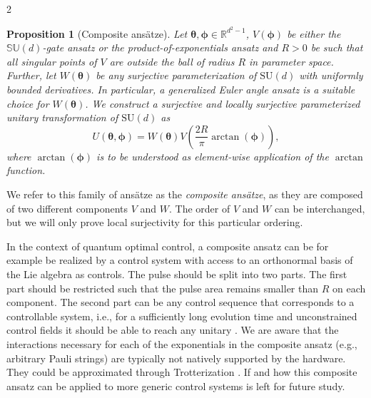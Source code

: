 \documentclass{article}
\renewcommand{\vec}[1]{\ensuremath{\boldsymbol{#1}}}
\newtheorem{proposition}{Proposition}
\begin{document}
\begin{multicols}{2}
\begin{proposition}[Composite ans\"atze]
    Let \(\vec{\theta}, \vec{\phi} \in \mathds{R}^{d^2-1}\), \(V(\vec{\phi})\) be either the \(\mathbb{SU}(d)\)-gate ansatz or the product-of-exponentials ansatz and \(R > 0\) be such that all singular points of \(V\) are outside the ball of radius \(R\) in parameter space.
    Further, let \(W(\vec{\theta})\) be any surjective parameterization of \(\mathrm{SU}(d)\) with uniformly bounded derivatives. In particular, a generalized Euler angle ansatz \cite{tilma_generalized_2002, dalessandro_optimal_2004} is a suitable choice for \(W(\vec{\theta})\).
    We construct a surjective and locally surjective parameterized unitary transformation of \(\mathrm{SU}(d)\) as
    \begin{equation}
        \label{eq:composite_ansätze}
        U(\vec{\theta}, \vec{\phi}) = W(\vec{\theta}) V \left( \frac{2R}{\pi} \arctan(\vec{\phi}) \right),
    \end{equation}
    where \(\arctan(\vec{\phi})\) is to be understood as element-wise application of the \(\arctan\) function.
    
\end{proposition}
We refer to this family of ansätze as the \emph{composite ansätze}, as they are composed of two different components \(V\) and \(W\).
The order of \(V\) and \(W\) can be interchanged, but we will only prove local surjectivity for this particular ordering.

In the context of quantum optimal control, a composite ansatz can be for example be realized by a control system with access to an orthonormal basis of the Lie algebra as controls.
The pulse should be split into two parts.
The first part should be restricted such that the pulse area remains smaller than \(R\) on each component.
The second part can be any control sequence that corresponds to a controllable system, i.e., for a sufficiently long evolution time and unconstrained control fields it should be able to reach any unitary \cite{jurdjevic_control_1972}.
We are aware that the interactions necessary for each of the exponentials in the composite ansatz (e.g., arbitrary Pauli strings) are typically not natively supported by the hardware.
They could be approximated through Trotterization \cite{dalessandro_general_2009}.
If and how this composite ansatz can be applied to more generic control systems is left for future study.


\end{multicols}
\end{document}
